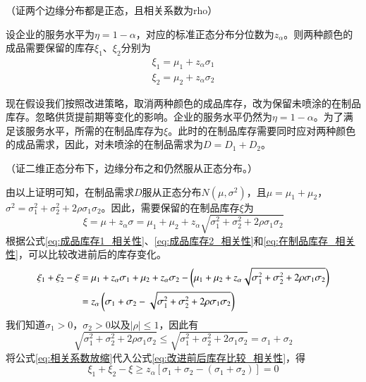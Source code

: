 （证两个边缘分布都是正态，且相关系数为rho）



设企业的服务水平为$\eta=1-\alpha$，对应的标准正态分布分位数为$z_\alpha$。则两种颜色的成品需要保留的库存$\xi_1$、$\xi_2$分别为
\begin{align}
\xi_1 = \mu_1 + z_\alpha\sigma_1 \label{eq:成品库存1_相关性}\\
\xi_2 = \mu_2 + z_\alpha\sigma_2 \label{eq:成品库存2_相关性}
\end{align}

现在假设我们按照改进策略，取消两种颜色的成品库存，改为保留未喷涂的在制品库存。忽略供货提前期等变化的影响。企业的服务水平仍然为$\eta=1-\alpha$。为了满足该服务水平，所需的在制品库存为$\xi$。此时的在制品库存需要同时应对两种颜色的成品需求，因此，对未喷涂的在制品需求为$D=D_1+D_2$。

（证二维正态分布下，边缘分布之和仍然服从正态分布。）

由以上证明可知，在制品需求$D$服从正态分布$N(\mu,\sigma^2)$，且$\mu=\mu_1+\mu_2$，$\sigma^2=\sigma_1^2+\sigma_2^2+2\rho\sigma_1\sigma_2$。因此，需要保留的在制品库存$\xi$为
\begin{equation}
\xi = \mu + z_\alpha\sigma = \mu_1 + \mu_2 + z_\alpha\sqrt{\sigma_1^2+\sigma_2^2+2\rho\sigma_1\sigma_2}
\label{eq:在制品库存_相关性}
\end{equation}
根据公式\ref{eq:成品库存1_相关性}、\ref{eq:成品库存2_相关性}和\ref{eq:在制品库存_相关性}，可以比较改进前后的库存变化。
\begin{align}
\xi_1+\xi_2-\xi &= \mu_1 + z_\alpha\sigma_1 + \mu_2 + z_\alpha\sigma_2 - \left(\mu_1 + \mu_2 + z_\alpha\sqrt{\sigma_1^2+\sigma_2^2+2\rho\sigma_1\sigma_2}\right) \notag\\
&= z_\alpha \left(\sigma_1+\sigma_2-\sqrt{\sigma_1^2+\sigma_2^2+2\rho\sigma_1\sigma_2}\right)
\label{eq:改进前后库存比较_相关性}
\end{align}
我们知道$\sigma_1>0$，$\sigma_2>0$以及$|\rho| \leq 1$，因此有
\begin{equation}
\sqrt{\sigma_1^2+\sigma_2^2+2\rho\sigma_1\sigma_2} \leq \sqrt{\sigma_1^2+\sigma_2^2+2\sigma_1\sigma_2} = \sigma_1+\sigma_2
\label{eq:相关系数放缩}
\end{equation}
将公式\ref{eq:相关系数放缩}代入公式\ref{eq:改进前后库存比较_相关性}，得
\begin{equation}
\xi_1+\xi_2-\xi \geq z_\alpha \left[\sigma_1+\sigma_2-(\sigma_1+\sigma_2)\right] = 0
\label{eq:改进前后库存比较结果_相关性}
\end{equation}

